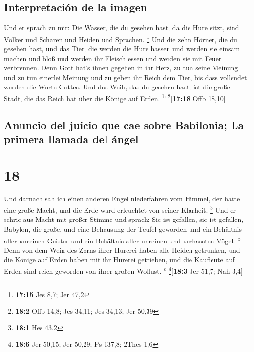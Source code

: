 \hypertarget{interpretaciuxf3n-de-la-imagen}{%
\subsection{Interpretación de la
imagen}\label{interpretaciuxf3n-de-la-imagen}}

 Und er sprach zu mir: Die Wasser, die du gesehen hast,
da die Hure sitzt, sind Völker und Scharen und Heiden und Sprachen.
\footnote{\textbf{17:15} Jes 8,7; Jer 47,2}  Und die zehn
Hörner, die du gesehen hast, und das Tier, die werden die Hure hassen
und werden sie einsam machen und bloß und werden ihr Fleisch essen und
werden sie mit Feuer verbrennen.  Denn Gott hat's ihnen
gegeben in ihr Herz, zu tun seine Meinung und zu tun einerlei Meinung
und zu geben ihr Reich dem Tier, bis dass vollendet werden die Worte
Gottes.  Und das Weib, das du gesehen hast, ist die große
Stadt, die das Reich hat über die Könige auf Erden. \textsuperscript{b}
\footnote{\textbf{18:2} Offb 14,8; Jes 34,11; Jes 34,13; Jer 50,39}{[}\textbf{17:18}
Offb 18,10{]}

\hypertarget{anuncio-del-juicio-que-cae-sobre-babilonia-la-primera-llamada-del-uxe1ngel}{%
\subsection{Anuncio del juicio que cae sobre Babilonia; La primera
llamada del
ángel}\label{anuncio-del-juicio-que-cae-sobre-babilonia-la-primera-llamada-del-uxe1ngel}}

\hypertarget{section-17}{%
\section{18}\label{section-17}}

 Und darnach sah ich einen anderen Engel niederfahren vom
Himmel, der hatte eine große Macht, und die Erde ward erleuchtet von
seiner Klarheit. \footnote{\textbf{18:1} Hes 43,2}  Und er
schrie aus Macht mit großer Stimme und sprach: Sie ist gefallen, sie ist
gefallen, Babylon, die große, und eine Behausung der Teufel geworden und
ein Behältnis aller unreinen Geister und ein Behältnis aller unreinen
und verhassten Vögel. \textsuperscript{b}  Denn von dem
Wein des Zorns ihrer Hurerei haben alle Heiden getrunken, und die Könige
auf Erden haben mit ihr Hurerei getrieben, und die Kaufleute auf Erden
sind reich geworden von ihrer großen Wollust. \textsuperscript{c}
\footnote{\textbf{18:6} Jer 50,15; Jer 50,29; Ps 137,8; 2Thes 1,6}{[}\textbf{18:3}
Jer 51,7; Nah 3,4{]}

